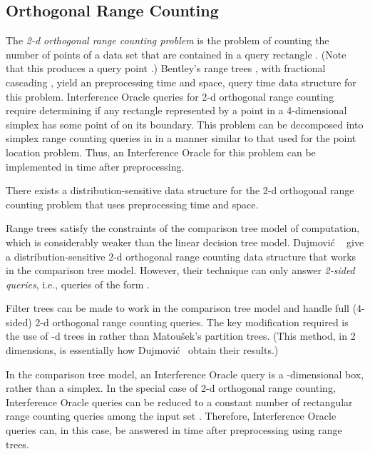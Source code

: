 \documentclass{patmorin}
\begin{document}
\subsection{Orthogonal Range Counting}

The \emph{2-d orthogonal range counting problem} is the problem
of counting the number of points of a data set  that
are contained in a query rectangle . (Note
that this produces a query point .) Bentley's range trees
\cite{b75}, with fractional cascading \cite{cg86,l78}, yield an  preprocessing time and space,  query time data structure
for this problem.  Interference Oracle queries for 2-d orthogonal
range counting require determining if any rectangle represented by a
point in a 4-dimensional simplex has some point of  on its boundary.
This problem can be decomposed into  simplex range counting queries
in  in a manner similar to that used for the point location problem.
Thus, an Interference Oracle for this problem can be implemented in
 time after  preprocessing.

\begin{thm}
  There exists a distribution-sensitive data structure for the 2-d
  orthogonal range counting problem that uses  preprocessing
  time and  space.
\end{thm}

Range trees satisfy the constraints of the comparison tree model of
computation, which is considerably weaker than the linear decision tree
model. Dujmovi\'c \etal\ \cite{dhm09} give a distribution-sensitive 2-d
orthogonal range counting data structure that works in the comparison
tree model.  However, their technique can only answer \emph{2-sided
queries}, i.e., queries of the form .

Filter trees can be made to work in the comparison tree model
and handle full (4-sided) 2-d orthogonal range counting queries.
The key modification required is the use of -d trees in
 rather than Matou\v{s}ek's partition
trees. (This method, in 2 dimensions, is essentially how Dujmovi\'c \etal\
obtain their results.)

In the comparison tree model, an Interference Oracle query is a
-dimensional box, rather than a simplex. In the special case of 2-d
orthogonal range counting, Interference Oracle queries can be reduced to
a constant number of rectangular range counting queries among the input
set .  Therefore, Interference Oracle queries can, in this case,
be answered in  time after  preprocessing using
range trees.
\end{document}
